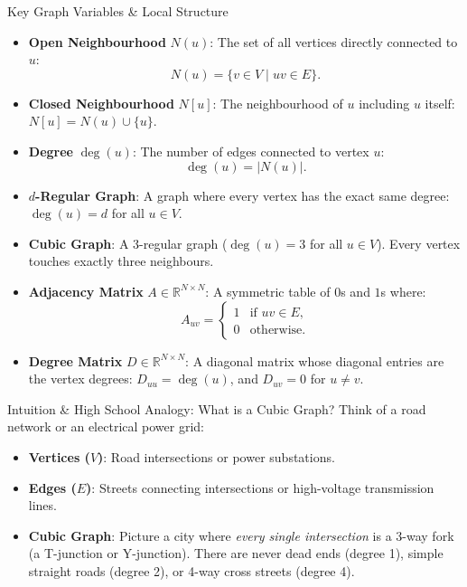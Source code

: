 \documentclass[11pt]{article}
\begin{document}
\begin{defbox}{Key Graph Variables \& Local Structure}
\begin{itemize}[leftmargin=*,nosep]
  \item \textbf{Open Neighbourhood} $N(u)$: The set of all vertices directly connected to $u$:
  \begin{equation}
    N(u) = \{v \in V \mid uv \in E\}.
  \end{equation}
  \item \textbf{Closed Neighbourhood} $N[u]$: The neighbourhood of $u$ including $u$ itself: $N[u] = N(u) \cup \{u\}$.
  \item \textbf{Degree} $\deg(u)$: The number of edges connected to vertex $u$:
  \begin{equation}
    \deg(u) = |N(u)|.
  \end{equation}
  \item \textbf{$d$-Regular Graph}: A graph where every vertex has the exact same degree: $\deg(u) = d$ for all $u \in V$.
  \item \textbf{Cubic Graph}: A 3-regular graph ($\deg(u) = 3$ for all $u \in V$). Every vertex touches exactly three neighbours.
  \item \textbf{Adjacency Matrix} $A \in \mathbb{R}^{N \times N}$: A symmetric table of $0$s and $1$s where:
  \begin{equation}
    A_{uv} = \begin{cases} 1 & \text{if } uv \in E, \\ 0 & \text{otherwise}. \end{cases}
  \end{equation}
  \item \textbf{Degree Matrix} $D \in \mathbb{R}^{N \times N}$: A diagonal matrix whose diagonal entries are the vertex degrees: $D_{uu} = \deg(u)$, and $D_{uv} = 0$ for $u \ne v$.
\end{itemize}
\end{defbox}

\begin{intubox}{Intuition \& High School Analogy: What is a Cubic Graph?}
Think of a road network or an electrical power grid:
\begin{itemize}[leftmargin=*,nosep]
  \item \textbf{Vertices ($V$)}: Road intersections or power substations.
  \item \textbf{Edges ($E$)}: Streets connecting intersections or high-voltage transmission lines.
  \item \textbf{Cubic Graph}: Picture a city where \emph{every single intersection} is a 3-way fork (a T-junction or Y-junction). There are never dead ends (degree 1), simple straight roads (degree 2), or 4-way cross streets (degree 4).
\end{itemize}
\end{intubox}
\end{document}
